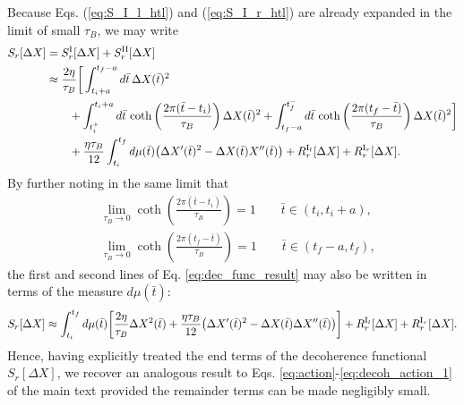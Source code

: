 \documentclass[prl,twocolumn,superscriptaddress,amsmath,amssymb]{revtex4-2}
\def\be{\begin{equation}}
\def\ee{\end{equation}}
\newcommand{\tb}{\bar{t}}
\begin{document}
Because Eqs. (\ref{eq:S_I_l_htl}) and (\ref{eq:S_I_r_htl}) are already expanded in the limit of small $\tau_B$, we may write
\begin{align}\label{eq:dec_func_result}
	S_r[\Delta X] &= S^{\rm I}_r[\Delta X] + S^{\rm II}_r[\Delta X] \nonumber\\
	      &\approx \frac{2\eta}{\tau_B}\bigg[\int^{t_f-a}_{t_i+a}d\tb\,\Delta X(\tb)^2  \nonumber \\
	      &\qquad + \int^{t_i+a}_{t^+_i}d\tb\,\coth\left(\frac{2\pi(\tb-t_i)}{\tau_B}\right)\Delta X(\tb)^2 + \int^{t^-_f}_{t_f-a}d\tb\,\coth\left(\frac{2\pi(t_f-\tb)}{\tau_B}\right)\Delta X(\tb)^2\bigg] \nonumber\\
	      &\qquad + \frac{\eta\tau_B}{12}\int^{t_f}_{t_i}d\mu(\tb)\big(\Delta X'(\tb)^2 - \Delta X(\tb)X''(\tb)\big) + R^{{\rm I}_l}_r[\Delta X] + R^{{\rm I}_r}_r[\Delta X].
\end{align}
By further noting in the same limit that 
\begin{align*}
    &\lim_{\tau_B\rightarrow0}\coth\left(\frac{2\pi(\tb-t_i)}{\tau_B}\right) = 1 \qquad \tb\in(t_i,t_i+a), \\
    &\lim_{\tau_B\rightarrow0}\coth\left(\frac{2\pi(t_f-\tb)}{\tau_B}\right) = 1 \qquad \tb\in(t_f-a,t_f), 
\end{align*}
the first and second lines of Eq. \eqref{eq:dec_func_result} may also be written in terms of the measure $d\mu(\tb)$: 
\be
    S_r[\Delta X] \approx \int^{t_f}_{t_i}d\mu(\tb)\bigg[\frac{2\eta}{\tau_B}\Delta X^2(\tb) + \frac{\eta\tau_B}{12}\big(\Delta X'(\tb)^2 - \Delta X(\tb)\Delta X''(\tb)\big)\bigg] + R^{{\rm I}_l}_r[\Delta X] + R^{{\rm I}_r}_r[\Delta X].
\ee
Hence, having explicitly treated the end terms of the decoherence functional $S_r[\Delta X]$, we recover an analogous result to Eqs. \eqref{eq:action}-\eqref{eq:decoh_action_1} of the main text provided the remainder terms can be made negligibly small.
\end{document}
